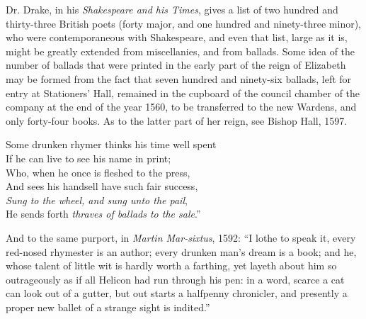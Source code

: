 Dr. Drake, in his \textit{Shakespeare and his Times}, gives a list of two hundred and
thirty-three British poets
 (forty major, and one hundred and ninety-three
minor), who were contemporaneous with Shakespeare, and even that list, large as
it is, might be greatly extended from miscellanies, and from ballads. Some idea
of the number of ballads that were printed \pagebreak in the early part of the reign of
Elizabeth may be formed from the fact that seven hundred and ninety-six ballads,
left for entry at Stationers’ Hall, remained in the cupboard of the council chamber
of the company at the end of the year 1560, to be transferred to the new
Wardens, and only forty-four books.
 As to the latter part of her reign, see
Bishop Hall, 1597.

\settowidth{\versewidth}{Some drunken rhymer thinks his time well spent}
\begin{scverse}
Some drunken rhymer thinks his time well spent\\
If he can live to see his name in print;\\
Who, when he once is fleshed to the press,\\
And sees his handsell have such fair success,\\
\textit{Sung to the wheel, and sung unto the pail},\\
He sends forth \textit{thraves
 of ballads to the sale}.”
\end{scverse}

And to the same purport, in \textit{Martin Mar-sixtus}, 1592: “I lothe to speak it,
every red-nosed rhymester is an author; every drunken man’s dream is a book;
and he, whose talent of little wit is hardly worth a farthing, yet layeth about him
so outrageously as if all Helicon had run through his pen: in a word, scarce a cat
can look out of a gutter, but out starts a halfpenny chronicler, and presently a
proper new ballet of a strange sight is indited.”

